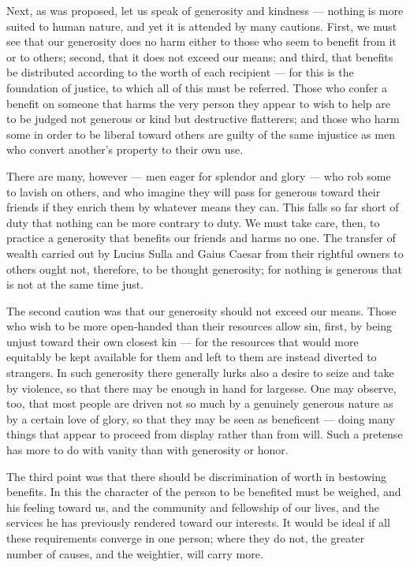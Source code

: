 Next, as was proposed, let us speak of generosity and kindness — nothing is more suited to human nature, and yet it is attended by many cautions. First, we must see that our generosity does no harm either to those who seem to benefit from it or to others; second, that it does not exceed our means; and third, that benefits be distributed according to the worth of each recipient — for this is the foundation of justice, to which all of this must be referred. Those who confer a benefit on someone that harms the very person they appear to wish to help are to be judged not generous or kind but destructive flatterers; and those who harm some in order to be liberal toward others are guilty of the same injustice as men who convert another's property to their own use.

 There are many, however — men eager for splendor and glory — who rob some to lavish on others, and who imagine they will pass for generous toward their friends if they enrich them by whatever means they can. This falls so far short of duty that nothing can be more contrary to duty. We must take care, then, to practice a generosity that benefits our friends and harms no one. The transfer of wealth carried out by Lucius Sulla and Gaius Caesar from their rightful owners to others ought not, therefore, to be thought generosity; for nothing is generous that is not at the same time just.

 The second caution was that our generosity should not exceed our means. Those who wish to be more open-handed than their resources allow sin, first, by being unjust toward their own closest kin — for the resources that would more equitably be kept available for them and left to them are instead diverted to strangers. In such generosity there generally lurks also a desire to seize and take by violence, so that there may be enough in hand for largesse. One may observe, too, that most people are driven not so much by a genuinely generous nature as by a certain love of glory, so that they may be seen as beneficent — doing many things that appear to proceed from display rather than from will. Such a pretense has more to do with vanity than with generosity or honor.

 The third point was that there should be discrimination of worth in bestowing benefits. In this the character of the person to be benefited must be weighed, and his feeling toward us, and the community and fellowship of our lives, and the services he has previously rendered toward our interests. It would be ideal if all these requirements converge in one person; where they do not, the greater number of causes, and the weightier, will carry more.

